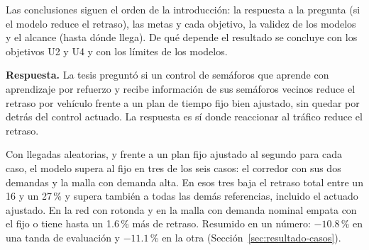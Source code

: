 
Las conclusiones siguen el orden de la introducción: la respuesta a la
pregunta (si el modelo reduce el retraso), las metas y cada objetivo, la
validez de los modelos y el alcance (hasta dónde llega). De qué depende
el resultado se concluye con los objetivos U2 y U4 y con los límites de
los modelos.

\noindent\textbf{Respuesta.} La tesis preguntó si un control de
semáforos que aprende con aprendizaje por refuerzo y recibe información
de sus semáforos vecinos reduce el retraso por vehículo frente a un plan
de tiempo fijo bien ajustado, sin quedar por detrás del control actuado.
La respuesta es sí donde reaccionar al tráfico reduce el retraso.

Con llegadas aleatorias, y frente a un plan fijo ajustado al
segundo para cada caso, el modelo supera al fijo en tres de los seis
casos: el corredor con sus dos demandas y la malla con demanda alta. En
esos tres baja el retraso total entre un 16 y un 27\,\% y supera también
a todas las demás referencias, incluido el actuado ajustado. En la red con rotonda y en la malla con demanda
nominal empata con el fijo o tiene hasta un 1.6\,\% más de retraso.
Resumido en un número: $-10.8$\,\% en una tanda de evaluación y
$-11.1$\,\% en la otra (Sección~\ref{sec:resultado-casos}).

